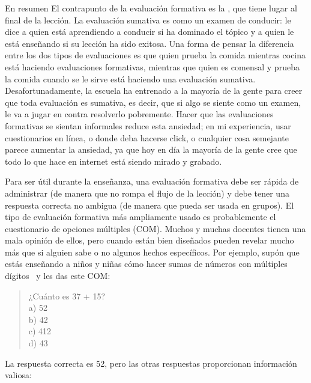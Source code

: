 \begin{aside}{En resumen}
El contrapunto de la evaluación formativa
es la ,
que tiene lugar al final de la lección.
La evaluación sumativa es como un examen de conducir:
le dice a quien está aprendiendo a conducir si ha dominado el tópico
y a quien le está enseñando si su lección ha sido exitosa.
Una forma de pensar la diferencia entre los dos tipos de evaluaciones es que
quien prueba la comida mientras cocina está haciendo evaluaciones formativas,
mientras que quien es comensal y prueba la comida cuando se le sirve está haciendo una evaluación sumativa. 
Desafortunadamente,
la escuela ha entrenado a la mayoría de la gente para creer que toda evaluación es sumativa, 
es decir, que si algo se siente como un examen,
le va a jugar en contra resolverlo pobremente.
Hacer que las evaluaciones formativas se sientan informales reduce esta ansiedad;
en mi experiencia,
usar cuestionarios en línea, o donde deba hacerse click, o cualquier cosa semejante parece aumentar la ansiedad,
ya que hoy en día la mayoría de la gente cree que todo lo que hace en internet está siendo mirado y grabado.
\end{aside}
 
Para ser útil durante la enseñanza,
una evaluación formativa debe ser rápida de administrar
(de manera que no rompa el flujo de la lección)
y debe tener una respuesta correcta no ambigua
(de manera que pueda ser usada en grupos).
El tipo de evaluación formativa más ampliamente usado es probablemente
el cuestionario de opciones múltiples (COM).
Muchos y muchas docentes tienen una mala opinión de ellos,
pero cuando están bien diseñados
pueden revelar mucho más que si alguien sabe o no algunos hechos específicos.
Por ejemplo,
supón que estás enseñando a niños y niñas cómo hacer sumas de números con múltiples dígitos~\cite{Ojos2015}
y les das este COM:

\begin{quote}
  ¿Cuánto es 37 + 15?\\
  a) 52\\
  b) 42\\
  c) 412\\
  d) 43
\end{quote}

\noindent
La respuesta correcta es 52,
pero las otras respuestas proporcionan información valiosa:

